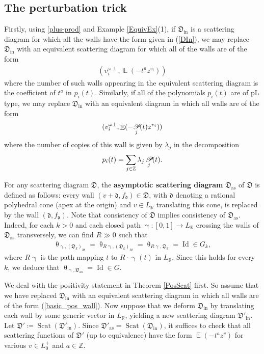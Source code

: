 \documentclass{amsart}
\DeclareMathOperator{\pl}{\mathscr{P}\!}
\DeclareMathOperator{\id}{Id}
\DeclareMathOperator{\Id}{Id}
\DeclareMathOperator{\In}{in}
\DeclareMathOperator{\EE}{\mathbb{E}}
\DeclareMathOperator{\as}{as}
\DeclareMathOperator{\scat}{Scat}
\def\!{\mskip-\thinmuskip}
\let\bb=\mathbb
\let\rar=\rightarrow
\let\f=\mathfrak
\renewcommand{\theta}{\uptheta}
\renewcommand{\gamma}{\upgamma}
\theoremstyle{plain}%
\theoremstyle{definition}
\theoremstyle{remark}
\begin{document}
\subsection{The perturbation trick}\label{PertTrick}

Firstly, using \eqref{plus-prod} and Example \ref{EquivEx}(1), if $\f{D}_{\In}$ is a scattering diagram for which all the walls have the form given in (\ref{DIn}), we may replace $\f{D}_{\In}$ with an equivalent scattering diagram for which all of the walls are of the form
\begin{align}\label{basic_pos_wall}
(v_i^{\omega\perp},\EE(-t^{a}z^{v_i}))
\end{align}
where the number of such walls appearing in the equivalent scattering diagram is the coefficient of $t^a$ in $p_i(t)$.  Similarly, if all of the polynomials $p_i(t)$ are of pL type, we may replace $\f{D}_{\In}$ with an equivalent diagram in which all walls are of the form
\begin{equation}\label{basic_PL_wall}
(v_i^{\omega\perp},\EE(-\!\pl_j(t)z^{v_i}))
\end{equation}
where the number of copies of this wall is given by $\lambda_j$ in the decomposition
\begin{equation*}
p_i(t)=\sum_{j\in\mathbb{Z}}\lambda_j\pl_j(t).
\end{equation*}

 
For any scattering diagram $\f{D}$, the \textbf{asymptotic scattering diagram} $\f{D}_{\as}$ of $\f{D}$ is defined as follows: every wall $(v+\f{d},f_{\f{d}})\in \f{D}$, with $\f{d}$ denoting a rational polyhedral cone (apex at the origin) and $v \in L_{\bb{R}}$ translating this cone, is replaced by the wall $(\f{d},f_{\f{d}})$.  Note that consistency of $\f{D}$ implies consistency of $\f{D}_{\as}$.  Indeed, for each $k>0$ and each closed path $\gamma\colon [0,1]\rar L_{\bb{R}}$ crossing the walls of $\f{D}_{\as}$ transversely,  we can find $R\gg 0$ such that
\begin{align*}
    \theta_{\gamma,(\f{D}_k)_{\as}} = \theta_{R\gamma,(\f{D}_k)_{\as}} = \theta_{R\gamma,\f{D}_k}  = \id \in G_k,
\end{align*}
where $R\gamma$ is the path mapping $t$ to $R\cdot \gamma(t)$ in $L_{\bb{R}}$. Since this holds for every $k$, we deduce that $\theta_{\gamma,
\f{D}_{\as}}=\Id\in G$. 


We deal with the positivity statement in Theorem \ref{PosScat} first.  So assume that we have replaced $\f{D}_{\In}$ with an equivalent scattering diagram in which all walls are of the form (\ref{basic_pos_wall}).  Now suppose that we deform $\f{D}_{\In}$ by translating each wall by some generic vector in $L_{\bb{R}}$, yielding a new scattering diagram $\f{D}'_{\In}$.  Let $\f{D}'\coloneqq \scat(\f{D}'_{\In})$.  Since $\f{D}'_{\as}=\scat(\f{D}_{\In})$, it suffices to check that all scattering functions of $\f{D}'$ (up to equivalence) have the form $\EE(-t^az^v)$ for various $v\in L_0^+$ and $a\in\mathbb{Z}$. 
\end{document}
